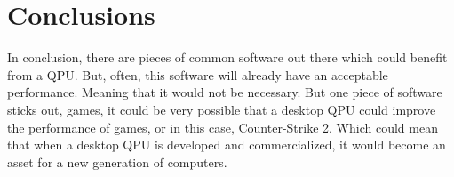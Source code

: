 \section{Conclusions}
\label{sec:conclusions}
In conclusion, there are pieces of common software out there which could benefit from a QPU. But, often, this software will already have an acceptable performance. Meaning that it would not be necessary. But one piece of software sticks out, games, it could be very possible that a desktop QPU could improve the performance of games, or in this case, Counter-Strike 2. Which could mean that when a desktop QPU is developed and commercialized, it would become an asset for a new generation of computers.